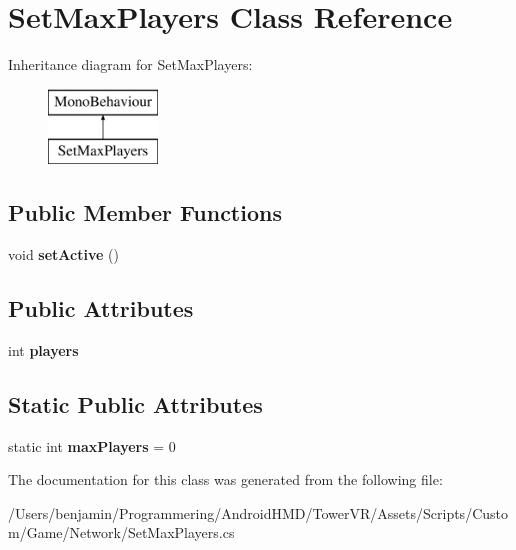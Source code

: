 \hypertarget{class_set_max_players}{}\section{Set\+Max\+Players Class Reference}
\label{class_set_max_players}
Inheritance diagram for Set\+Max\+Players\+:\begin{figure}[H]
\begin{center}
\leavevmode
\includegraphics[height=2.000000cm]{class_set_max_players}
\end{center}
\end{figure}
\subsection*{Public Member Functions}
\begin{DoxyCompactItemize}
\item 
void {\bfseries set\+Active} ()\hypertarget{class_set_max_players_afebc031cc7036b36ae05dffe21a32849}{}\label{class_set_max_players_afebc031cc7036b36ae05dffe21a32849}

\end{DoxyCompactItemize}
\subsection*{Public Attributes}
\begin{DoxyCompactItemize}
\item 
int {\bfseries players}\hypertarget{class_set_max_players_a5fee95595f6b72090b66fab053845dd3}{}\label{class_set_max_players_a5fee95595f6b72090b66fab053845dd3}

\end{DoxyCompactItemize}
\subsection*{Static Public Attributes}
\begin{DoxyCompactItemize}
\item 
static int {\bfseries max\+Players} = 0\hypertarget{class_set_max_players_a057c086cee6f48c72f8c042bc267317f}{}\label{class_set_max_players_a057c086cee6f48c72f8c042bc267317f}

\end{DoxyCompactItemize}


The documentation for this class was generated from the following file\+:\begin{DoxyCompactItemize}
\item 
/\+Users/benjamin/\+Programmering/\+Android\+H\+M\+D/\+Tower\+V\+R/\+Assets/\+Scripts/\+Custom/\+Game/\+Network/Set\+Max\+Players.\+cs\end{DoxyCompactItemize}
